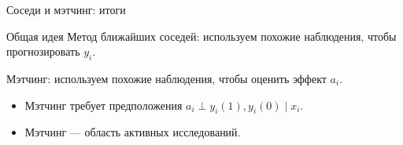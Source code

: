 \begin{frame}{Соседи и мэтчинг: итоги}

  \begin{block}{Общая идея}
    Метод ближайших соседей: используем похожие наблюдения, чтобы \alert{прогнозировать} $y_i$.
    
    Мэтчинг: используем похожие наблюдения, чтобы \alert{оценить эффект} $a_i$.
    \end{block}

\pause
    
  \begin{itemize}[<+->]
    \item Мэтчинг требует предположения $a_i \perp y_i(1), y_i(0) \mid x_i$.
    \item Мэтчинг — область активных исследований.
  \end{itemize}

\end{frame}



